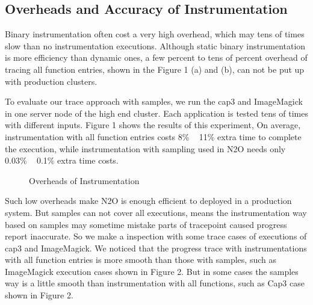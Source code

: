 \subsection{Overheads and Accuracy of Instrumentation}

Binary instrumentation often cost a very high overhead, which may tens of  times slow than no instrumentation executions. Although static binary instrumentation is more efficiency than dynamic ones, a few percent to tens of percent overhead of tracing all function entries, shown in the Figure 1 (a) and (b), can not be put up with production clusters. 

To evaluate our trace approach with samples, we run the cap3 and ImageMagick in one server node of the high end cluster. Each application is tested tens of times with different inputs. Figure 1 shows the results of this experiment, On average, instrumentation with all function entries costs 8\% ~ 11\% extra time to complete the execution, while instrumentation with sampling used in N2O needs only 0.03\% ~ 0.1\% extra time costs.

\begin{figure}
\centering
{}
\caption{Overheads of Instrumentation}
\label{figure:overheads}
\end{figure}

Such low overheads make N2O is enough efficient to deployed in a production system. But samples can not cover all executions, means the instrumentation way based on samples may sometime mistake parts of tracepoint caused progress report inaccurate. So we make a inspection with some trace cases of executions of cap3 and ImageMagick. We noticed that the progress trace with instrumentations with all function entries is more smooth than those with samples, such as ImageMagick execution cases shown in Figure 2. But in some cases the samples way is a little smooth than instrumentation with all functions, such as Cap3 case shown in Figure 2.

